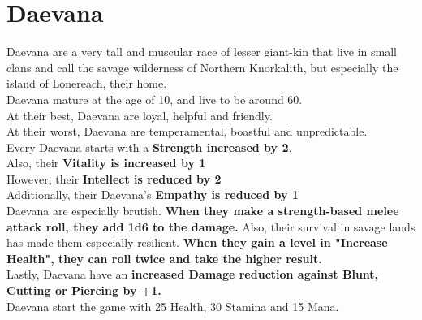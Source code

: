 \section{Daevana}\label{race:daevana}
Daevana are a very tall and muscular race of lesser giant-kin that live in small clans and call the savage wilderness of Northern Knorkalith, but especially the island of Lonereach, their home.\\
Daevana mature at the age of 10, and live to be around 60.\\
At their best, Daevana are loyal, helpful and friendly.\\
At their worst, Daevana are temperamental, boastful and unpredictable.\\
Every Daevana starts with a \textbf{Strength increased by 2}.\\
Also, their \textbf{Vitality is increased by 1}\\
However, their \textbf{Intellect is reduced by 2}\\
Additionally, their Daevana's \textbf{Empathy is reduced by 1}\\
Daevana are especially brutish. \textbf{When they make a strength-based melee attack roll, they add 1d6 to the damage.}
Also, their survival in savage lands has made them especially resilient.
\textbf{When they gain a level in "Increase Health", they can roll twice and take the higher result.}\\
Lastly, Daevana have an \textbf{increased Damage reduction against Blunt, Cutting or Piercing by +1.}\\
Daevana start the game with 25 Health, 30 Stamina and 15 Mana.